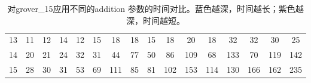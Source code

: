 \begin{table}[!htbp]
{\begin{tabular}{c|ccccccccccccccc}
        \rowcolor[HTML]{8DB4E2} 
        \cellcolor[HTML]{FFFFFF}13 & 11                                               & 12                          & 14                          & 12                          & 15                          & 18                                               & 18                         & 15                          & 18                          & 20                          & 18                          & 32                          & 32                          & 30                          & 25                          \\
        \rowcolor[HTML]{8DB4E2} 
        \cellcolor[HTML]{FFFFFF}14 & 20                                               & 21                          & 24                          & 32                          & 31                          & 44                                               & 77                         & 50                          & 86                          & \cellcolor[HTML]{538DD5}109 & 68                          & \cellcolor[HTML]{538DD5}133 & 70                          & \cellcolor[HTML]{538DD5}119 & \cellcolor[HTML]{538DD5}142 \\
        \rowcolor[HTML]{538DD5} 
        \cellcolor[HTML]{FFFFFF}15 & \cellcolor[HTML]{8DB4E2}28                       & \cellcolor[HTML]{8DB4E2}30  & \cellcolor[HTML]{8DB4E2}31  & \cellcolor[HTML]{8DB4E2}53  & \cellcolor[HTML]{8DB4E2}69  & 111                                              & \cellcolor[HTML]{8DB4E2}85 & \cellcolor[HTML]{8DB4E2}81  & 102                         & 153                         & 114                         & 130                         & 166                         & 162                         & 235                        
                         
        \end{tabular}
    }
    \caption{对grover\_15应用不同的addition 参数的时间对比。蓝色越深，时间越长；紫色越深，时间越短。}%
    \label{table:addition}
\end{table}
\begin{table}[htbp]
    \centering
    \caption{对grover\_15应用不同的contraction 参数的时间对比。}
    \label{table-contraction}
\end{table}
